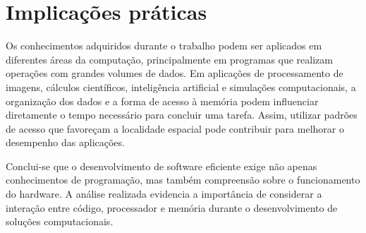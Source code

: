 \section{Implicações práticas}
Os conhecimentos adquiridos durante o trabalho podem ser aplicados em diferentes áreas da computação, principalmente em programas que realizam operações com grandes volumes de dados. Em aplicações de processamento de imagens, cálculos científicos, inteligência artificial e simulações computacionais, a organização dos dados e a forma de acesso à memória podem influenciar diretamente o tempo necessário para concluir uma tarefa. Assim, utilizar padrões de acesso que favoreçam a localidade espacial pode contribuir para melhorar o desempenho das aplicações.

Conclui-se que o desenvolvimento de software eficiente exige não apenas conhecimentos de programação, mas também compreensão sobre o funcionamento do hardware. A análise realizada evidencia a importância de considerar a interação entre código, processador e memória durante o desenvolvimento de soluções computacionais.